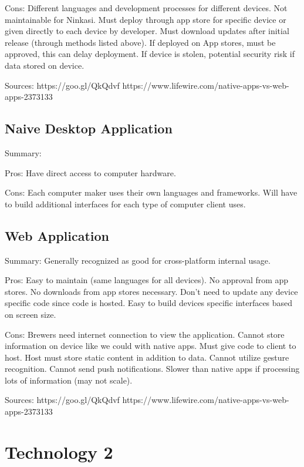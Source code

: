 \documentclass[draftclsnofoot,onecolumn,letterpaper,10pt,compsoc]{IEEEtran}
\begin{document}
    Cons:
        Different languages and development processes for different devices.
        Not maintainable for Ninkasi.
        Must deploy through app store for specific device or given directly     to each device by developer.
        Must download updates after initial release (through methods listed     above).
        If deployed on App stores, must be approved, this can delay             deployment.
        If device is stolen, potential security risk if data stored on          device.
    
    Sources:
    https://goo.gl/QkQdvf
    https://www.lifewire.com/native-apps-vs-web-apps-2373133
    
    
	\subsection{Naive Desktop Application}
    Summary:
    
    Pros:
        Have direct access to computer hardware.
    
    Cons:
        Each computer maker uses their own languages and frameworks.
        Will have to build additional interfaces for each type of computer          client uses.
    
    
	\subsection{Web Application}
    Summary:
        Generally recognized as good for cross-platform internal usage.
    
    Pros:
        Easy to maintain (same languages for all devices).
        No approval from app stores.
        No downloads from app stores necessary.
        Don't need to update any device specific code since code is hosted.
        Easy to build devices specific interfaces based on screen size.
    
    Cons:
        Brewers need internet connection to view the application.
        Cannot store information on device like we could with native apps.
        Must give code to client to host.
        Host must store static content in addition to data.
        Cannot utilize gesture recognition.
        Cannot send push notifications.
        Slower than native apps if processing lots of information (may not          scale).
    
    Sources:
        https://goo.gl/QkQdvf
        https://www.lifewire.com/native-apps-vs-web-apps-2373133

\section{Technology 2}
\end{document}
